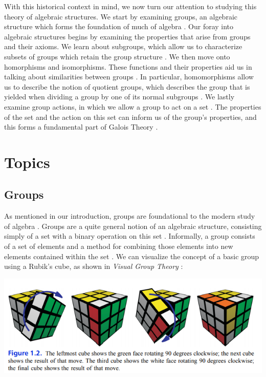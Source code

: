 \documentclass[11pt, reqno]{amsart}
\theoremstyle{plain}
\theoremstyle{definition}
\theoremstyle{example}
\begin{document}
\par
With this historical context in mind, we now turn our attention to studying this theory of algebraic structures. We start by examining groups, an algebraic structure which forms the foundation of much of algebra \cite{dummit, pinter}. Our foray into algebraic structures begins by examining the properties that arise from groups and their axioms. We learn about subgroups, which allow us to characterize subsets of groups which retain the group structure \cite{dummit, pinter, carter}. We then move onto homorphisms and isomorphisms. These functions and their properties aid us in talking about similarities between groups \cite{dummit}. In particular, homomorphisms allow us to describe the notion of quotient groups, which describes the group that is yielded when dividing a group by one of its normal subgroups \cite{dummit, carter}. We lastly examine group actions, in which we allow a group to act on a set \cite{dummit}. The properties of the set and the action on this set can inform us of the group's properties, and this forms a fundamental part of Galois Theory \cite{dummit}.

\newpage

\section{Topics}

\subsection{Groups}

\par
As mentioned in our introduction, groups are foundational to the modern study of algebra \cite{dummit, abstractwiki}. Groups are a quite general notion of an algebraic structure, consisting simply of a set with a binary operation on this set \cite{groupwiki}. Informally, a group consists of a set of elements and a method for combining those elements into new elements contained within the set \cite{pinter, carter}. We can visualize the concept of a basic group using a Rubik's cube, as shown in \textit{Visual Group Theory} \cite[\S 1.1, p. 4]{carter}:

\includegraphics[scale=1]{rubiks}
\end{document}
